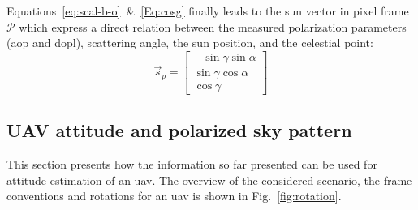 Equations~\ref{eq:scal-b-o}~\&~\ref{Eq:cosg} finally leads to the sun vector
in pixel frame $\mathcal{P}$ which express a direct relation between the
measured polarization parameters (\gls{aop} and \gls{dopl}),
scattering angle, the sun position,  and the celestial point:
\begin{equation}
  \label{eq:sunp}
  \vec{s}_{p} =
    \begin{bmatrix}
    -\sin\gamma \sin\alpha\\
    \sin\gamma \cos\alpha\\
    \cos\gamma
  \end{bmatrix}
\end{equation}

\subsection{UAV attitude and polarized sky pattern}
\label{subsec:ps-attitude}
This section presents how the information so far presented can be used for
attitude estimation of an \gls{uav}.
The overview of the considered scenario, the frame conventions and rotations
for an \gls{uav} is shown in Fig.~\ref{fig:rotation}.

